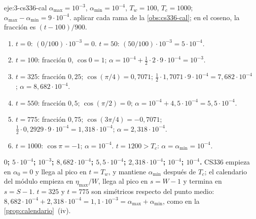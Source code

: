 \begin{solucion}{eje:3-cs336-cal}
\datos $\alpha_{\max}=10^{-3}$, $\alpha_{\min}=10^{-4}$, $T_w=100$, $T_c=1000$; $\alpha_{\max}-\alpha_{\min}=9\cdot 10^{-4}$.
\planteamiento aplicar cada rama de la \cref{obs:cs336-cal}; en el coseno, la fracción es $(t-100)/900$.
\pasos
\begin{enumerate}[label=\arabic*.]
  \item $t=0$: $(0/100)\cdot 10^{-3}=0$. $t=50$: $(50/100)\cdot 10^{-3}=5\cdot 10^{-4}$.
  \item $t=100$: fracción $0$, $\cos 0=1$; $\alpha=10^{-4}+\tfrac12\cdot 2\cdot 9\cdot 10^{-4}=10^{-3}$.
  \item $t=325$: fracción $0{,}25$; $\cos(\pi/4)=0{,}7071$; $\tfrac12\cdot 1{,}7071\cdot 9\cdot 10^{-4}=7{,}682\cdot 10^{-4}$; $\alpha=8{,}682\cdot 10^{-4}$.
  \item $t=550$: fracción $0{,}5$; $\cos(\pi/2)=0$; $\alpha=10^{-4}+4{,}5\cdot 10^{-4}=5{,}5\cdot 10^{-4}$.
  \item $t=775$: fracción $0{,}75$; $\cos(3\pi/4)=-0{,}7071$; $\tfrac12\cdot 0{,}2929\cdot 9\cdot 10^{-4}=1{,}318\cdot 10^{-4}$; $\alpha=2{,}318\cdot 10^{-4}$.
  \item $t=1000$: $\cos\pi=-1$; $\alpha=10^{-4}$. $t=1200>T_c$: $\alpha=\alpha_{\min}=10^{-4}$.
\end{enumerate}
\resultado \textbf{$0$; $5\cdot 10^{-4}$; $10^{-3}$; $8{,}682\cdot 10^{-4}$; $5{,}5\cdot 10^{-4}$; $2{,}318\cdot 10^{-4}$; $10^{-4}$; $10^{-4}$.} CS336 empieza en $\alpha_0=0$ y llega al pico en $t=T_w$, y mantiene $\alpha_{\min}$ después de $T_c$; el calendario del módulo empieza en $\eta_{\max}/W$, llega al pico en $s=W-1$ y termina en $s=S-1$.
\comprobacion $t=325$ y $t=775$ son simétricos respecto del punto medio: $8{,}682\cdot 10^{-4}+2{,}318\cdot 10^{-4}=1{,}1\cdot 10^{-3}=\alpha_{\max}+\alpha_{\min}$, como en la \cref{prop:calendario}~(iv).
\end{solucion}


